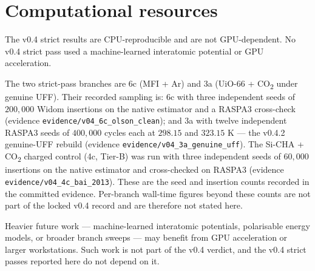 \section{Computational resources}\label{app:compute}

The v0.4 strict results are CPU-reproducible and are not GPU-dependent. No v0.4 strict pass used a machine-learned interatomic potential or GPU acceleration.

The two strict-pass branches are 6c (MFI + Ar) and 3a (UiO-66 + CO\textsubscript{2} under genuine UFF). Their recorded sampling is: 6c with three independent seeds of \(200{,}000\) Widom insertions on the native estimator and a RASPA3 cross-check (evidence \texttt{evidence/v04\_6c\_olson\_clean}); and 3a with twelve independent RASPA3 seeds of \(400{,}000\) cycles each at \(298.15\) and \(323.15\) K --- the v0.4.2 genuine-UFF rebuild (evidence \texttt{evidence/v04\_3a\_genuine\_uff}). The Si-CHA + CO\textsubscript{2} charged control (4c, Tier-B) was run with three independent seeds of \(60{,}000\) insertions on the native estimator and cross-checked on RASPA3 (evidence \texttt{evidence/v04\_4c\_bai\_2013}). These are the seed and insertion counts recorded in the committed evidence. Per-branch wall-time figures beyond these counts are not part of the locked v0.4 record and are therefore not stated here.

Heavier future work --- machine-learned interatomic potentials, polarisable energy models, or broader branch sweeps --- may benefit from GPU acceleration or larger workstations. Such work is not part of the v0.4 verdict, and the v0.4 strict passes reported here do not depend on it.

